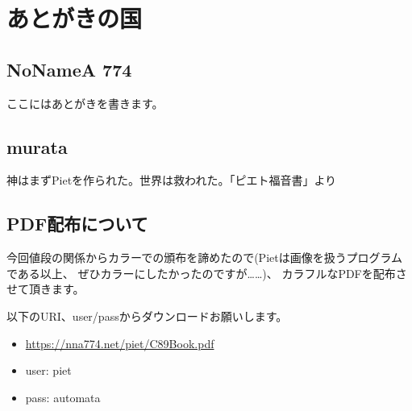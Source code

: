 \chapter[あとがきの国]{あとがきの国}

\section{NoNameA 774}

ここにはあとがきを書きます。

\section{murata}

神はまずPietを作られた。世界は救われた。「ピエト福音書」より

\section{PDF配布について}

今回値段の関係からカラーでの頒布を諦めたので(Pietは画像を扱うプログラムである以上、
ぜひカラーにしたかったのですが……)、
カラフルなPDFを配布させて頂きます。

以下のURI、user/passからダウンロードお願いします。
\begin{itemize}
\item
  \url{https://nna774.net/piet/C89Book.pdf}
\item
  user: piet
\item
  pass: automata
\end{itemize}

